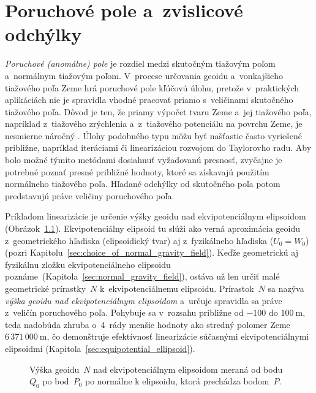 \documentclass[a4paper, 12pt]{book}
\begin{document}

\chapter{Poruchové pole a~zvislicové odchýlky}
\label{sec:disturbing_field_deflections}

\emph{Poruchové (anomálne) pole} je rozdiel medzi skutočným tiažovým poľom 
a~normálnym tiažovým poľom.  V~procese určovania geoidu a~vonkajšieho tiažového 
poľa Zeme hrá poruchové pole kľúčovú úlohu, pretože v~praktických aplikáciách 
nie je spravidla vhodné pracovať priamo s~veličinami skutočného tiažového poľa.  
Dôvod je ten, že priamy výpočet tvaru Zeme a~jej tiažového poľa, napríklad 
z~tiažového zrýchlenia a~z~tiažového potenciálu na povrchu Zeme, je nesmierne 
náročný \parencite[pozri 
napríklad][]{Hormander1976,SansoGeodeticBoundaryValueProblem}.  Úlohy podobného 
typu môžu byť našťastie často vyriešené približne, napríklad iteráciami či 
linearizáciou rozvojom do Taylorovho radu.  Aby bolo možné týmito metódami 
dosiahnuť vyžadovanú presnosť, zvyčajne je potrebné poznať presné približné 
hodnoty, ktoré sa získavajú použitím normálneho tiažového poľa.  Hľadané 
odchýlky od skutočného poľa potom predstavujú práve veličiny poruchového poľa.

Príkladom linearizácie je určenie výšky geoidu nad ekvipotenciálnym elipsoidom 
(Obrázok~\ref{fig:geoid}).  Ekvipotenciálny elipsoid tu slúži ako verná 
aproximácia geoidu z~geometrického hľadiska (elipsoidický tvar) aj 
z~fyzikálneho hľadiska ($U_0 = W_0$) (pozri 
Kapitolu~\ref{sec:choice_of_normal_gravity_field}).  Keďže geometrickú aj 
fyzikálnu zložku ekvipotenciálneho elipsoidu 
poznáme~(Kapitola~\ref{sec:normal_gravity_field}), ostáva už len určiť malé 
geometrické prírastky~$N$ k~ekvipotenciálnemu elipsoidu.  Prírastok~$N$ sa 
nazýva \emph{výška geoidu nad ekvipotenciálnym elipsoidom} a~určuje spravidla 
sa práve z~veličín poruchového poľa.  Pohybuje sa v~rozsahu približne od $-100$ 
do $100\ \mathrm{m}$, teda nadobúda zhruba o~4~rády menšie hodnoty ako stredný 
polomer Zeme~$6\, 371 \, 000\ \mathrm{m}$, čo demonštruje efektívnosť 
linearizácie súčasnými ekvipotenciálnymi elipsoidmi 
(Kapitola~\ref{sec:equipotential_ellipsoid}).

\begin{figure}[bt]
\centering

\caption{Výška geoidu~$N$ nad ekvipotenciálnym elipsoidom meraná od bodu~$Q_0$ 
po bod~$P_0$ po normálne k elipsoidu, ktorá prechádza bodom~$P$.}
\label{fig:geoid}
\end{figure}
\end{document}
